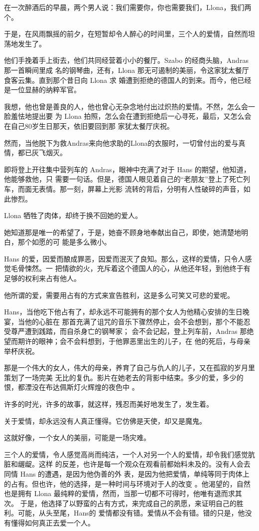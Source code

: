 \documentclass[12pt,a4paper]{article}
\begin{document}
		在一次醉酒后的早晨，两个男人说：我们需要你，你也需要我们，Llona，我们两个。

		于是，在风雨飘摇的前夕，在短暂却令人醉心的时间里，三个人的爱情，自然而坦荡地发生了。

		他们手挽着手上街去，他们共同经营着小小的餐厅。Szabo 的经商头脑，Andras 那一首瞬间里成
	名的钢琴曲，还有，Llona 那无可遏制的美丽，令这家犹太餐厅食客云集。直到那个昔日向 Llona 求
	婚遭到拒绝的德国人的到来。而今，他已经是一位显赫的纳粹军官。

		我想，他也曾是善良的人，他也曾心无杂念地付出过炽热的爱情。不然，怎么会一脸羞怯地提出要
	为 Llona 拍照，怎么会在遭到拒绝后一心寻死，最后，又怎么会在自己80岁生日那天，依旧要回到那
	家犹太餐厅庆祝。

		然而，当他脱下为救Andras来向他求助的Llona的衣服时，一切曾付出的爱与真情，都已灰飞烟灭。

		即将登上开往集中营列车的 Andras，眼神中充满了对于 Hans 的期望，他知道，他能够救他，只
	需要一句话。但是，德国人眼见着自己的“老朋友”登上了死亡列车，而面无表情。那一刻，屏幕上光影
	流转的背后，分明有人性破碎的声音，如此惨烈。

		Llona 牺牲了肉体，却终于换不回她的爱人。

		她知道那是唯一的希望了，于是，她奋不顾身地奉献出自己，即使，她清楚地明白，那个如愿的可
	能是多么微小。

		Hans 的爱，因爱而酿成罪恶，因爱而泯灭了良知。那么，这样的爱情，只令人感觉毛骨悚然。一
	把情欲的火，充斥着这个德国人的心，从他还年轻，到他终于有足够的权利来占有他人。

		他所谓的爱，需要用占有的方式来宣告胜利，这是多么可笑又可悲的爱呢。

		Hans，当他吃下他占有了，却永远不可能拥有的那个女人为他精心安排的生日晚宴，当他的心脏在
	那首充满了诅咒的音乐下骤然停止，会不会想到，那个不能忍受尊严遭到践踏，而自杀身亡的钢琴家；
	会不会记起，登上列车前，Andras 那绝望而期许的眼神；会不会料想到，于他罪恶里出生的儿子，在
	他的死后，与母亲举杯庆祝。

		那是一个伟大的女人，伟大的母亲，养育了自己与仇人的儿子，又在孤寂的岁月里策划了一场完美
	无比的复仇。影片在她老去的背影中结束。多少的爱，多少的恨，都湮没在布达佩斯灯火辉煌的夜色中
	。

		许多的时光，许多的故事，就这样，残忍而美好地发生了，发生着。\par
		关于爱情，却永远没有人真正懂得。它仿佛是天使，却又是魔鬼。\par
		这就好像，一个女人的美丽，可能是一场灾难。

		三个人的爱情，令人感觉高尚而纯洁，一个人对另一个人的爱情，却令我们感觉肮脏和龌龊。这样
	的反差，也许是每一个观众在观看前都始料未及的。没有人会去同情 Hans 的遭遇，是因为他伪善的外
	表，是因为他把爱情，单纯等同于肉体上的占有。但也许，他的选择，是一种时间与环境对于人的改变
	。他渴望的，自然也是拥有 Llona 最纯粹的爱情，然而，当那一切都不可得时，他唯有退而求其次。
	于是，他选择了以野蛮的占有方式，来完成自己的夙愿，来证明自己的胜利。可能，从头至尾，Hans的
	爱情都没有错。爱情从不会有错。错的只是，他没有懂得如何真正去爱一个人。
\end{document}
